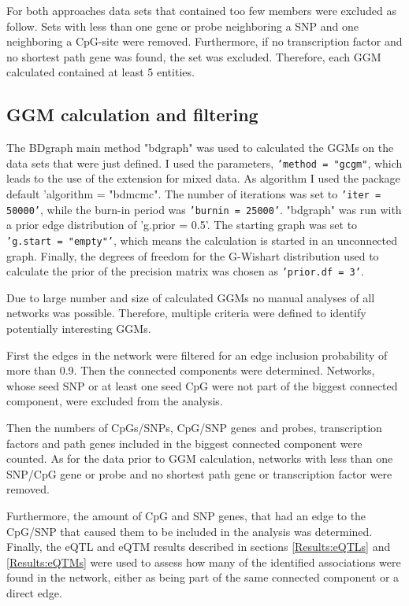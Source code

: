 \documentclass[a4paper,12pt,twoside,openright]{report}
\begin{document}
For both approaches data sets that contained too few members were excluded as follow. Sets with less than one gene or probe neighboring a SNP and one neighboring a CpG-site were removed. Furthermore, if no transcription factor and no shortest path gene was found, the set was excluded. Therefore, each GGM calculated contained at least 5 entities.

\subsection{GGM calculation and filtering}
\label{Methods:GGM calculation and filtering}
The BDgraph main method "bdgraph" was used to calculated the GGMs on the data sets that were just defined. I used the parameters, \texttt{'method = "gcgm"}, which leads to the use of the extension for mixed data. As algorithm I used the package default 'algorithm = "bdmcmc". The number of iterations was set to \texttt{'iter = 50000'}, while the burn-in period was \texttt{'burnin = 25000'}. "bdgraph" was run with a prior edge distribution of 'g.prior = 0.5'. The starting graph was set to \texttt{'g.start = "empty"'}, which means the calculation is started in an unconnected graph. Finally, the degrees of freedom for the G-Wishart distribution used to calculate the prior of the precision matrix was chosen as \texttt{'prior.df = 3'}.

Due to large number and size of calculated GGMs no manual analyses of all networks was possible. Therefore, multiple criteria were defined to identify potentially interesting GGMs.

First the edges in the network were filtered for an edge inclusion probability of more than 0.9. Then the connected components were determined. Networks, whose seed SNP or at least one seed CpG were not part of the biggest connected component, were excluded from the analysis. 

Then the numbers of CpGs/SNPs, CpG/SNP genes and probes, transcription factors and path genes included in the biggest connected component were counted. As for the data prior to GGM calculation, networks with less than one SNP/CpG gene or probe and no shortest path gene or transcription factor were removed. 

Furthermore, the amount of CpG and SNP genes, that had an edge to the CpG/SNP that caused them to be included in the analysis was determined. Finally, the eQTL and eQTM results described in sections \ref{Results:eQTLs} and \ref{Results:eQTMs} were used to assess how many of the identified associations were found in the network, either as being part of the same connected component or a direct edge. 
\end{document}
